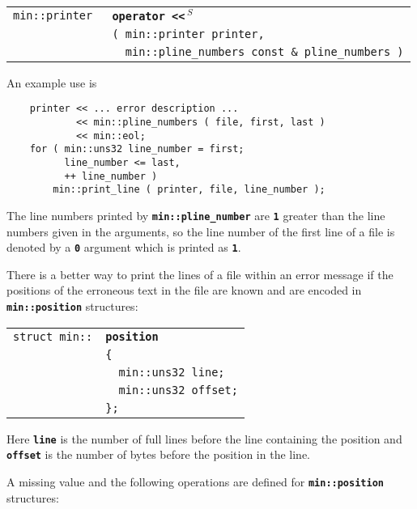 \documentclass[12pt]{article}
\makeatletter
\newcommand{\TT}[1]{{\tt \bfseries #1}}
\newcommand{\ttindex}[1]{\index{#1@{\tt #1}}}
\newcommand{\ttmindex}[2]{\index{#1@{\tt #1}!#2}}
\newcommand{\ttomkey}[3]{\TT{operator #2}\index{#1@{\tt operator #2}!{#3}}}
\newcommand{\EOL}{\penalty \exhyphenpenalty}
\newenvironment{indpar}[1][0.3in]%
	{\begin{list}{}%
		     {\setlength{\itemsep}{0in}%
		      \setlength{\topsep}{0in}%
		      \setlength{\parsep}{1ex}%
		      \setlength{\labelwidth}{#1}%
		      \setlength{\leftmargin}{#1}%
		      \addtolength{\leftmargin}{\labelsep}}%
	 \item}%
	{\end{list}}
\newcommand{\LABEL}[1]{\label{#1}}
\newlength{\ARGBREAKLENGTH}
\newcommand{\ARGBREAK}[1][\ARGBREAKLENGTH]{\\&\hspace*{#1}}
\newcommand{\TTOMKEY}[3]{\ttomkey{#1}{#2}{#3}}
\newcommand{\MINKEY}[1]%
	   {\TT{#1}\ttindex{min::#1}\ttindex{#1}}
\newcommand{\RESIZE}{$\,^S$}
\makeatother
\begin{document}
\begin{indpar}[1em]\begin{tabular}{r@{}l}
\verb|min::printer |
    & \TTOMKEY{<<}{<{}<\RESIZE}%
              {of {\tt min::printer}}\ARGBREAK
      \verb|( min::printer printer,|\ARGBREAK
      \verb|  min::pline_numbers const & pline_numbers )|
\LABEL{PRINTER_OPERATOR<<_OF_PLINE_NUMBERS} \\
\end{tabular}\end{indpar}

An example use is

\begin{indpar}\begin{verbatim}
    printer << ... error description ...
            << min::pline_numbers ( file, first, last )
            << min::eol;
    for ( min::uns32 line_number = first;
          line_number <= last,
          ++ line_number )
        min::print_line ( printer, file, line_number );
\end{verbatim}\end{indpar}

The line numbers printed by \TT{min::\EOL pline\_\EOL number}
are \TT{1} greater than the line numbers given in the arguments,
so the line number of the first line of a file is denoted by a
\TT{0} argument which is printed as \TT{1}.

There is a better way to print the lines of a file within an
error message if the positions of the erroneous text in the file
are known and are encoded in
\TT{min::position} structures:

\begin{indpar}[1em]\begin{tabular}{r@{}l}
\verb|struct min::| & \MINKEY{position}\ARGBREAK
    \verb|{|\ARGBREAK
    \verb|  min::uns32 line;|\ARGBREAK
    \verb|  min::uns32 offset;|\ARGBREAK
    \verb|};|
\ttmindex{line}{in {\tt min::position}}
\ttmindex{offset}{in {\tt min::position}}
\ttmindex{column}{in {\tt min::position}}
\LABEL{MIN::POSITION_STRUCT} \\
\end{tabular}\end{indpar}

Here \TT{line} is the number of full lines before the line
containing the position and \TT{offset} is the
number of bytes before the position in the line.

A missing value and the following operations are defined
for \TT{min::\EOL position} structures:
\end{document}
